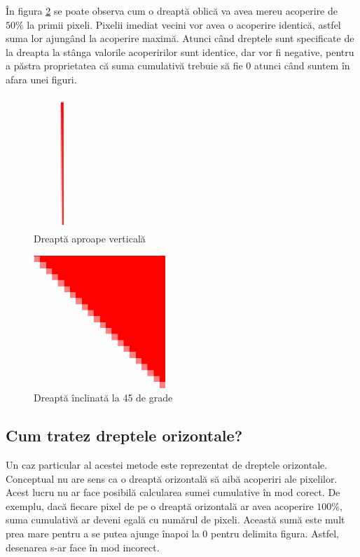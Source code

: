 \documentclass[a4paper, 12pt]{report}
\begin{document}
În figura \ref{fig-linie-oblica} se poate observa cum o dreaptă oblică va avea mereu acoperire de \(50\%\) la primii pixeli. Pixelii imediat
vecini vor avea o acoperire identică, astfel suma lor ajungând la acoperire maximă. Atunci când dreptele sunt specificate de la dreapta
la stânga valorile acoperirilor sunt identice, dar vor fi negative, pentru a păstra proprietatea că suma cumulativă trebuie să fie
0 atunci când suntem în afara unei figuri.

\begin{figure}[ht]
    \includegraphics[height=5cm]{linie_aproximativ_verticala.png}
    \centering
    \caption{Dreaptă aproape verticală}
    \label{fig-linie-verticala}
\end{figure}

\begin{figure}[ht]
    \includegraphics[height=5cm]{linie_oblica.png}
    \centering
    \caption{Dreaptă înclinată la 45 de grade}
    \label{fig-linie-oblica}
\end{figure}

\subsection{Cum tratez dreptele orizontale?}

Un caz particular al acestei metode este reprezentat de dreptele orizontale. Conceptual nu are sens ca o dreaptă
orizontală să aibă acoperiri ale pixelilor. Acest lucru nu ar face posibilă calcularea sumei cumulative în mod corect.
De exemplu, dacă fiecare pixel de pe o dreaptă orizontală ar avea acoperire \(100\%\), suma cumulativă ar deveni egală
cu numărul de pixeli. Această sumă este mult prea mare pentru a se putea ajunge înapoi la 0 pentru delimita figura.
Astfel, desenarea s-ar face în mod incorect.
\end{document}

